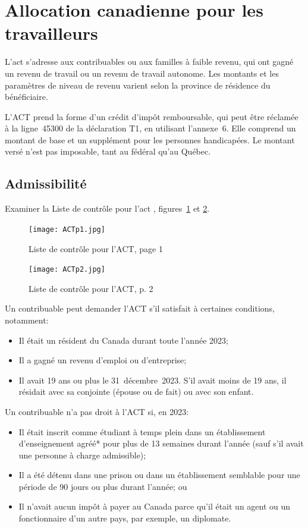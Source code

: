 \section{Allocation canadienne pour les travailleurs}
\begin{intro}
	L'\acrfull{act} s'adresse aux contribuables ou aux familles à faible revenu, qui ont gagné un revenu de travail ou un revenu de travail autonome. Les montants et les paramètres de niveau de revenu varient selon la province de résidence du bénéficiaire.
	
	L'ACT prend la forme d'un crédit d'impôt remboursable, qui peut être réclamée à la ligne~45300 de la déclaration T1, en utilisant l'annexe~6. Elle comprend un montant de base et un supplément pour les personnes handicapées. Le montant versé n'est pas imposable, tant au fédéral qu'au Québec.
\end{intro}

\subsection{Admissibilité}
Examiner la \og Liste de contrôle pour l'\acrfull{act} \fg{}, figures~\ref{fig:ACTp1} et \ref{fig:ACTp2}.
\begin{figure}
	\centering
	\texttt{[image: ACTp1.jpg]}
	\caption{Liste de contrôle pour l'ACT, page 1}
	\label{fig:ACTp1}
\end{figure}
\begin{figure}
	\centering
	\texttt{[image: ACTp2.jpg]}
	\caption{Liste de contrôle pour l'ACT, p. 2}
	\label{fig:ACTp2}
\end{figure}
Un contribuable peut demander l'ACT s'il satisfait à certaines conditions, notamment:
\begin{itemize}[label=]
	\item Il était un résident du Canada durant toute l'année 2023;
	\item Il a gagné un revenu d'emploi ou d'entreprise;
	\item Il avait 19 ans ou plus le 31~décembre~2023. S'il avait moins de 19 ans, il résidait avec sa conjointe (épouse ou de fait) ou avec son enfant.
\end{itemize}

Un contribuable n'a pas droit à l'ACT si, en 2023:
\begin{itemize}[label=]
	\item Il était inscrit comme étudiant à temps plein dans un établissement d'enseignement agréé* pour plus de 13 semaines durant l'année (sauf s'il avait une personne à charge admissible);
	\item Il a été détenu dans une prison ou dans un établissement semblable pour une période de 90 jours ou plus durant l'année; ou
	\item Il n'avait aucun impôt à payer au Canada parce qu'il était un agent ou un fonctionnaire d'un autre pays, par exemple, un diplomate.
\end{itemize}


